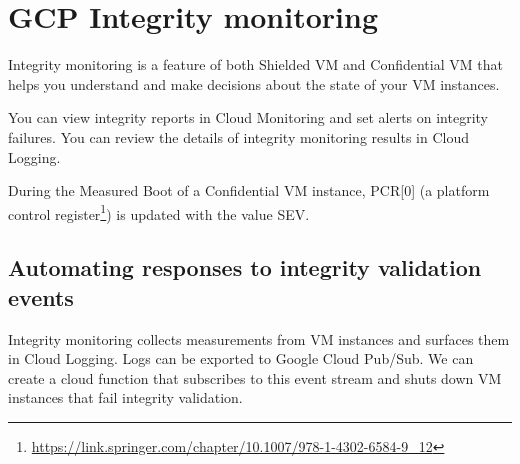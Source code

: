 
\section{GCP Integrity monitoring}

Integrity monitoring is a feature of both Shielded VM 
and Confidential VM that helps you understand 
and make decisions about the state of your VM instances.

You can view integrity reports in Cloud Monitoring 
and set alerts on integrity failures. 
You can review the details of integrity monitoring results in Cloud Logging.

During the Measured Boot of a Confidential VM instance, 
PCR[0] (a platform control register\footnote{\url{https://link.springer.com/chapter/10.1007/978-1-4302-6584-9_12}}) 
is updated with the value SEV.

\subsection{Automating responses to integrity validation events}
Integrity monitoring collects measurements from VM instances 
and surfaces them in Cloud Logging. 
Logs can be exported to Google Cloud Pub/Sub. 
We can create a cloud function that subscribes to this event stream 
and shuts down VM instances that fail integrity validation.

